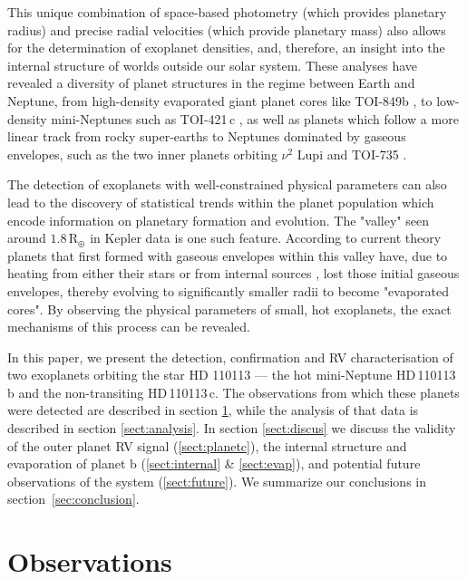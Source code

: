 \documentclass[fleqn,usenatbib]{mnras}
\newcommand{\gcm}{g\,cm$^{-3}$}	%
\newcommand{\rearth}{R$_{\oplus}$}
\newcommand{\Tplanet}{HD\,110113\,b}
\newcommand{\Tplanetc}{HD\,110113\,c}
\begin{document}
This unique combination of space-based photometry (which provides planetary radius) and precise radial velocities (which provide planetary mass) also allows for the determination of exoplanet densities, and, therefore, an insight into the internal structure of worlds outside our solar system.
These analyses have revealed a diversity of planet structures in the regime between Earth and Neptune, from high-density evaporated giant planet cores like TOI-849b \citep[5.2\,\gcm{}][]{armstrong2020remnant}, to low-density mini-Neptunes such as TOI-421\,c \citep{carleo2020multi}, as well as planets which follow a more linear track from rocky super-earths to Neptunes dominated by gaseous envelopes, such as the two inner planets orbiting $\nu^2$ Lupi \citep{kane2020transits} and TOI-735 \citep{cloutier2020pair,nowak2020carmenes}.

The detection of exoplanets with well-constrained physical parameters can also lead to the discovery of statistical trends within the planet population which encode information on planetary formation and evolution.
The "valley" seen around $1.8$\,\rearth{} in Kepler data \citep{fulton2017california, van2018asteroseismic} is one such feature.
According to current theory planets that first formed with gaseous envelopes within this valley have, due to heating from either their stars \citep[e.g. evaporation,][]{owen2017evaporation} or from internal sources \citep[e.g. core-powered mass loss,][]{ginzburg2018core}, lost those initial gaseous envelopes, thereby evolving to significantly smaller radii to become "evaporated cores".
By observing the physical parameters of small, hot exoplanets, the exact mechanisms of this process can be revealed.

In this paper, we present the detection, confirmation and RV characterisation of two exoplanets orbiting the star HD 110113 --- the hot mini-Neptune \Tplanet{} and the non-transiting \Tplanetc{}. 
The observations from which these planets were detected are described in section \ref{sect:observations}, while the analysis of that data is described in section \ref{sect:analysis}.
In section \ref{sect:discus} we discuss the validity of the outer planet RV signal (\ref{sect:planetc}), the internal structure and evaporation of planet b (\ref{sect:internal} \& \ref{sect:evap}), and potential future observations of the system (\ref{sect:future}).
We summarize our conclusions in section~\ref{sec:conclusion}.

\section{Observations}
\label{sect:observations}
\end{document}
